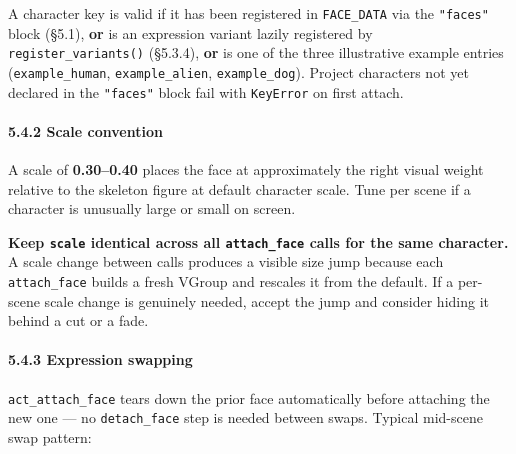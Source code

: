 \documentclass[
  11pt,
]{book}
\begin{document}
A character key is valid if it has been registered in
\texttt{FACE\_DATA} via the \texttt{"faces"} block (§5.1), \textbf{or}
is an expression variant lazily registered by
\texttt{register\_variants()} (§5.3.4), \textbf{or} is one of the three
illustrative example entries (\texttt{example\_human},
\texttt{example\_alien}, \texttt{example\_dog}). Project characters not
yet declared in the \texttt{"faces"} block fail with \texttt{KeyError}
on first attach.

\paragraph{5.4.2 Scale convention}\label{scale-convention}

A scale of \textbf{0.30--0.40} places the face at approximately the
right visual weight relative to the skeleton figure at default character
scale. Tune per scene if a character is unusually large or small on
screen.

\textbf{Keep \texttt{scale} identical across all \texttt{attach\_face}
calls for the same character.} A scale change between calls produces a
visible size jump because each \texttt{attach\_face} builds a fresh
VGroup and rescales it from the default. If a per-scene scale change is
genuinely needed, accept the jump and consider hiding it behind a cut or
a fade.

\paragraph{5.4.3 Expression swapping}\label{expression-swapping}

\texttt{act\_attach\_face} tears down the prior face automatically
before attaching the new one --- no \texttt{detach\_face} step is needed
between swaps. Typical mid-scene swap pattern:
\end{document}
